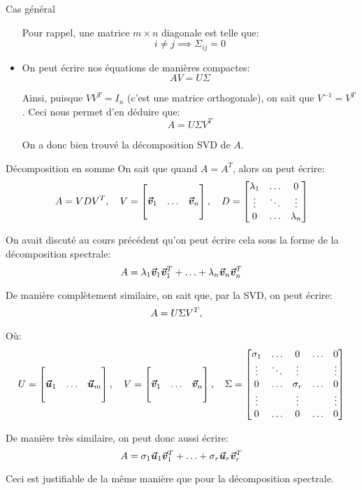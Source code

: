 \documentclass[a4paper]{article}
\begin{document}
\begin{parag}{Cas général}
\begin{itemize}[left=0pt]
    Pour rappel, une matrice $m \times n$ diagonale est telle que:
    \[i \neq j \implies \Sigma_{ij} = 0\]


    \item On peut écrire nos équations de manières compactes:
    \[AV = U\Sigma\]

    Ainsi, puisque $VV^T = I_n$ (c'est une matrice orthogonale), on sait que $V^{-1} = V^T$. Ceci nous permet d'en déduire que:
    \[A = U\Sigma V^T\]

    On a donc bien trouvé la décomposition SVD de $A$.
    \end{itemize}
\end{parag}

\begin{parag}{Décomposition en somme}
    On sait que quand $A = A^T$, alors on peut écrire:
    \[A = VDV^T, \quad V = \begin{bmatrix}  &  &  \\ \bm{\protect\vec{v}}_1 & \ldots & \bm{\protect\vec{v}}_n \\  &  &  \end{bmatrix}, \quad D = \begin{bmatrix} \lambda_1 & \ldots & 0 \\ \vdots & \ddots & \vdots \\ 0 & \ldots & \lambda_n \end{bmatrix} \]

    On avait discuté au cours précédent qu'on peut écrire cela sous la forme de la décomposition spectrale:
    \[A = \lambda_1 \bm{\protect\vec{v}}_1 \bm{\protect\vec{v}}_1^T + \ldots + \lambda_n \bm{\protect\vec{v}}_n \bm{\protect\vec{v}}_n^T\]

    De manière complètement similaire, on sait que, par la SVD, on peut écrire:
    \[A = U \Sigma V^T, \quad  \]

    Où:
    \[U = \begin{bmatrix}  &  &  \\ \bm{\protect\vec{u}}_1 & \ldots & \bm{\protect\vec{u}}_m \\  &  &  \end{bmatrix}, \quad V = \begin{bmatrix}  &  &  \\ \bm{\protect\vec{v}}_1 & \ldots & \bm{\protect\vec{v}}_n \\  &  &  \end{bmatrix}, \quad \Sigma = \begin{bmatrix} \sigma_1 & \ldots & 0 & \ldots & 0 \\ \vdots & \ddots & \vdots &  & \vdots \\ 0 & \ldots & \sigma_r & \ldots & 0 \\ \vdots &  & \vdots &  & \vdots \\ 0 & \ldots & 0 & \ldots & 0 \end{bmatrix}\]

    De manière très similaire, on peut donc aussi écrire:
    \[A = \sigma_1 \bm{\protect\vec{u}}_1 \bm{\protect\vec{v}}_1^T + \ldots + \sigma_r \bm{\protect\vec{u}}_r \bm{\protect\vec{v}}_r^T\]

    Ceci est justifiable de la même manière que pour la décomposition spectrale.
\end{parag}
\end{document}
